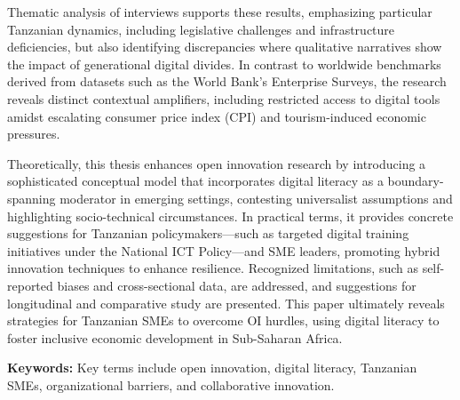 Thematic analysis of interviews supports these results, emphasizing particular Tanzanian dynamics, including legislative challenges and infrastructure deficiencies, but also identifying discrepancies where qualitative narratives show the impact of generational digital divides. In contrast to worldwide benchmarks derived from datasets such as the World Bank's Enterprise Surveys, the research reveals distinct contextual amplifiers, including restricted access to digital tools amidst escalating consumer price index (CPI) and tourism-induced economic pressures.

Theoretically, this thesis enhances open innovation research by introducing a sophisticated conceptual model that incorporates digital literacy as a boundary-spanning moderator in emerging settings, contesting universalist assumptions and highlighting socio-technical circumstances. In practical terms, it provides concrete suggestions for Tanzanian policymakers—such as targeted digital training initiatives under the National ICT Policy—and SME leaders, promoting hybrid innovation techniques to enhance resilience. Recognized limitations, such as self-reported biases and cross-sectional data, are addressed, and suggestions for longitudinal and comparative study are presented. This paper ultimately reveals strategies for Tanzanian SMEs to overcome OI hurdles, using digital literacy to foster inclusive economic development in Sub-Saharan Africa.

\textbf{Keywords:} Key terms include open innovation, digital literacy, Tanzanian SMEs, organizational barriers, and collaborative innovation.